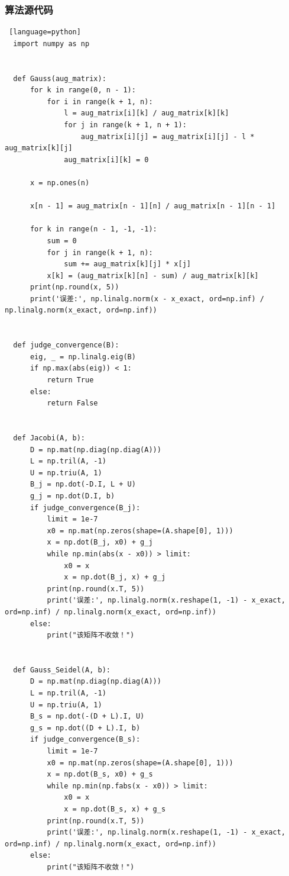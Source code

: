 \documentclass[UTF8]{ctexart}
\begin{document}
\subsubsection{算法源代码}
\begin{lstlisting} [language=python]
  import numpy as np


  def Gauss(aug_matrix):
      for k in range(0, n - 1):
          for i in range(k + 1, n):
              l = aug_matrix[i][k] / aug_matrix[k][k]
              for j in range(k + 1, n + 1):
                  aug_matrix[i][j] = aug_matrix[i][j] - l * aug_matrix[k][j]
              aug_matrix[i][k] = 0
  
      x = np.ones(n)
  
      x[n - 1] = aug_matrix[n - 1][n] / aug_matrix[n - 1][n - 1]
  
      for k in range(n - 1, -1, -1):
          sum = 0
          for j in range(k + 1, n):
              sum += aug_matrix[k][j] * x[j]
          x[k] = (aug_matrix[k][n] - sum) / aug_matrix[k][k]
      print(np.round(x, 5))
      print('误差:', np.linalg.norm(x - x_exact, ord=np.inf) / np.linalg.norm(x_exact, ord=np.inf))
  
  
  def judge_convergence(B):
      eig, _ = np.linalg.eig(B)
      if np.max(abs(eig)) < 1:
          return True
      else:
          return False
  
  
  def Jacobi(A, b):
      D = np.mat(np.diag(np.diag(A)))
      L = np.tril(A, -1)
      U = np.triu(A, 1)
      B_j = np.dot(-D.I, L + U)
      g_j = np.dot(D.I, b)
      if judge_convergence(B_j):
          limit = 1e-7
          x0 = np.mat(np.zeros(shape=(A.shape[0], 1)))
          x = np.dot(B_j, x0) + g_j
          while np.min(abs(x - x0)) > limit:
              x0 = x
              x = np.dot(B_j, x) + g_j
          print(np.round(x.T, 5))
          print('误差:', np.linalg.norm(x.reshape(1, -1) - x_exact, ord=np.inf) / np.linalg.norm(x_exact, ord=np.inf))
      else:
          print("该矩阵不收敛！")
  
  
  def Gauss_Seidel(A, b):
      D = np.mat(np.diag(np.diag(A)))
      L = np.tril(A, -1)
      U = np.triu(A, 1)
      B_s = np.dot(-(D + L).I, U)
      g_s = np.dot((D + L).I, b)
      if judge_convergence(B_s):
          limit = 1e-7
          x0 = np.mat(np.zeros(shape=(A.shape[0], 1)))
          x = np.dot(B_s, x0) + g_s
          while np.min(np.fabs(x - x0)) > limit:
              x0 = x
              x = np.dot(B_s, x) + g_s
          print(np.round(x.T, 5))
          print('误差:', np.linalg.norm(x.reshape(1, -1) - x_exact, ord=np.inf) / np.linalg.norm(x_exact, ord=np.inf))
      else:
          print("该矩阵不收敛！")
  

\end{lstlisting}
\end{document}
